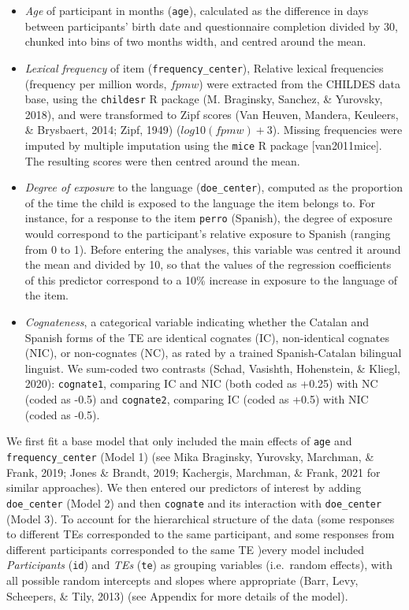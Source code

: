 \documentclass[
  english,
  man,man,floatsintext]{apa6}
\providecommand{\tightlist}{%
  \setlength{\itemsep}{0pt}\setlength{\parskip}{0pt}}
\begin{document}
\begin{itemize}
\tightlist
\item
  \emph{Age} of participant in months (\texttt{age}), calculated as the difference in days between participants' birth date and questionnaire completion divided by 30, chunked into bins of two months width, and centred around the mean.
\item
  \emph{Lexical frequency} of item (\texttt{frequency\_center}), Relative lexical frequencies (frequency per million words, \(fpmw\)) were extracted from the CHILDES data base, using the \texttt{childesr} R package (M. Braginsky, Sanchez, \& Yurovsky, 2018), and were transformed to Zipf scores (Van Heuven, Mandera, Keuleers, \& Brysbaert, 2014; Zipf, 1949) (\(log10(fpmw)+3\)). Missing frequencies were imputed by multiple imputation using the \texttt{mice} R package {[}van2011mice{]}. The resulting scores were then centred around the mean.
\item
  \emph{Degree of exposure} to the language (\texttt{doe\_center}), computed as the proportion of the time the child is exposed to the language the item belongs to. For instance, for a response to the item \texttt{perro} (Spanish), the degree of exposure would correspond to the participant's relative exposure to Spanish (ranging from 0 to 1). Before entering the analyses, this variable was centred it around the mean and divided by 10, so that the values of the regression coefficients of this predictor correspond to a 10\% increase in exposure to the language of the item.
\item
  \emph{Cognateness}, a categorical variable indicating whether the Catalan and Spanish forms of the TE are identical cognates (IC), non-identical cognates (NIC), or non-cognates (NC), as rated by a trained Spanish-Catalan bilingual linguist. We sum-coded two contrasts (Schad, Vasishth, Hohenstein, \& Kliegl, 2020): \texttt{cognate1}, comparing IC and NIC (both coded as +0.25) with NC (coded as -0.5) and \texttt{cognate2}, comparing IC (coded as +0.5) with NIC (coded as -0.5).
\end{itemize}

We first fit a base model that only included the main effects of \texttt{age} and \texttt{frequency\_center} (Model 1) (see Mika Braginsky, Yurovsky, Marchman, \& Frank, 2019; Jones \& Brandt, 2019; Kachergis, Marchman, \& Frank, 2021 for similar approaches). We then entered our predictors of interest by adding \texttt{doe\_center} (Model 2) and then \texttt{cognate} and its interaction with \texttt{doe\_center} (Model 3). To account for the hierarchical structure of the data (some responses to different TEs corresponded to the same participant, and some responses from different participants corresponded to the same TE )every model included \emph{Participants} (\texttt{id}) and \emph{TEs} (\texttt{te}) as grouping variables (i.e.~random effects), with all possible random intercepts and slopes where appropriate (Barr, Levy, Scheepers, \& Tily, 2013) (see Appendix for more details of the model).
\end{document}

